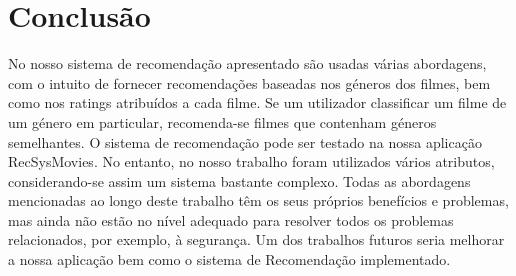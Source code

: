 \section{Conclusão}

No nosso sistema de recomendação apresentado são usadas várias abordagens, com o intuito de fornecer recomendações baseadas nos géneros dos filmes, bem como nos ratings atribuídos a cada filme. Se um utilizador classificar um filme de um género em particular, recomenda-se filmes que contenham géneros semelhantes. 
O sistema de recomendação pode ser testado na nossa aplicação RecSysMovies. No entanto, no nosso trabalho foram utilizados vários atributos, considerando-se assim um sistema bastante complexo. 
Todas as abordagens mencionadas ao longo deste trabalho têm os seus próprios benefícios e problemas, mas ainda não estão no nível adequado para resolver todos os problemas relacionados, por exemplo, à segurança. Um dos trabalhos futuros seria melhorar a nossa aplicação bem como o sistema de Recomendação implementado.

